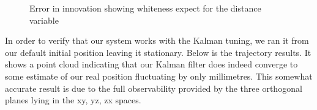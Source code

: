 \documentclass[]{article}
\begin{document}
{\begin{figure}[H]
	\centering     %
	\;
	\;
	\;
	\;
	\caption{Error in innovation showing whiteness expect for the distance variable}
	\label{fig:errorfigures}
\end{figure}


In order to verify that our system works with the Kalman tuning, we ran it from our default initial position leaving it stationary. Below is the trajectory results. It shows a point cloud indicating that our Kalman filter does indeed converge to some estimate of our real position fluctuating by only millimetres. This  somewhat accurate result is due to the full observability provided by the three orthogonal planes lying in the xy, yz, zx spaces.

}
\end{document}

